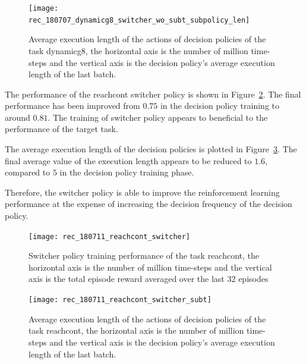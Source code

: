\begin{figure}[!htbp]
	\centering
	\texttt{[image: rec\_180707\_dynamicg8\_switcher\_wo\_subt\_subpolicy\_len]}
	\caption{Average execution length of the actions of decision policies of the task dynamicg8, the horizontal axis is the number of million time-steps and the vertical axis is the decision policy's average execution length of the last batch.}
	\label{fig:rec_dynamicg8_avesubt}
\end{figure}

The performance of the reachcont switcher policy is shown in Figure~\ref{fig:rec_reachcont_switcher}. The final performance has been improved from $0.75$ in the decision policy training to around $0.81$. The training of switcher policy appears to beneficial to the performance of the target task.

The average execution length of the decision policies is plotted in Figure~\ref{fig:rec_reachcont_switcher_subt}. The final average value of the execution length appears to be reduced to $1.6$, compared to $5$ in the decision policy training phase.

Therefore, the switcher policy is able to improve the reinforcement learning performance at the expense of increasing the decision frequency of the decision policy.

\begin{figure}[!htbp]
	\centering
	\texttt{[image: rec\_180711\_reachcont\_switcher]}
	\caption{Switcher policy training performance of the task reachcont, the horizontal axis is the number of million time-steps and the vertical axis is the total episode reward averaged over the last 32 episodes}
	\label{fig:rec_reachcont_switcher}
\end{figure}
\begin{figure}[!htbp]
	\centering
	\texttt{[image: rec\_180711\_reachcont\_switcher\_subt]}
	\caption{Average execution length of the actions of decision policies of the task reachcont, the horizontal axis is the number of million time-steps and the vertical axis is the decision policy's average execution length of the last batch.}
	\label{fig:rec_reachcont_switcher_subt}
\end{figure}

